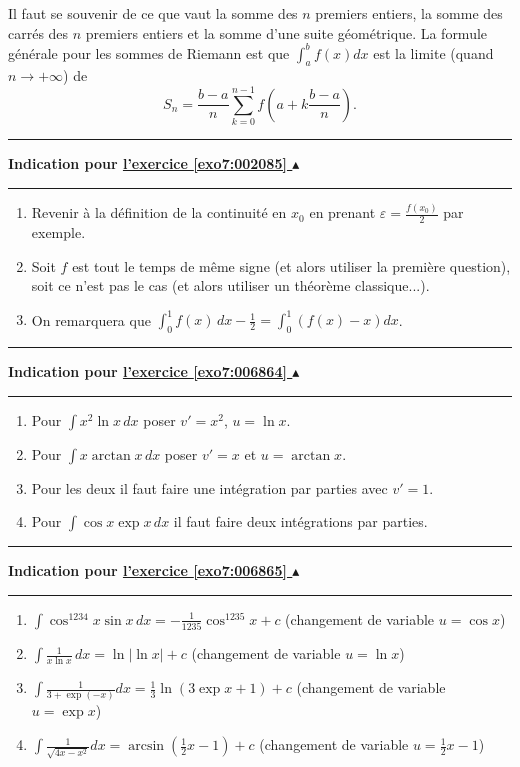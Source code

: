 \documentclass[11pt,a4paper]{article}
\renewcommand{\epsilon}{\varepsilon}
\newcommand{\noindication}{}
\newcounter{exo}
\newcommand{\indication}[1]{\hypertarget{ind7:#1}{}\label{ind7:#1}{\bf Indication pour \hyperlink{exo7:#1}{l'exercice \ref{exo7:#1} $\blacktriangle$}}\vspace{1mm}\hrule\vspace{1mm}}
\newcommand{\finindication}{\vspace{1mm}\hrule\vspace*{7mm}}
\begin{document}
Il faut se souvenir de ce que vaut la somme des $n$ premiers entiers, la somme des carrés des $n$ premiers entiers 
et la somme d'une suite géométrique.
La formule générale pour les sommes de Riemann est que $\int_a^bf(x)d x$
est la limite (quand $n \to +\infty$) de 
$$S_n = \frac {b-a}n \sum_{k=0}^{n-1} f\left(a+k\frac {b-a}n\right).$$
\finindication
\indication{002085}
  \begin{enumerate}
  \item Revenir à la définition de la continuité en $x_0$ en prenant $\epsilon = \frac {f(x_0)}{2}$ par exemple.
  \item Soit $f$ est tout le temps de même signe (et alors utiliser la première question), soit ce n'est pas le cas (et alors utiliser un théorème classique...).
  \item On remarquera que $\int_0^1 f(x) \, dx - \frac 12 = \int_0^1 (f(x) - x) dx$.
  \end{enumerate}
\finindication
\noindication
\indication{006864}
\begin{enumerate}
  \item Pour $\int x^2 \ln x \, dx$ poser $v'=x^2$, $u=\ln x$.

  \item Pour $\int x \arctan x \, dx$ poser $v'=x$ et $u= \arctan x$.

  \item Pour les deux il faut faire une intégration par parties avec $v'=1$.

  \item Pour $\int \cos x\exp x \,dx$ il faut faire deux intégrations par parties.
\end{enumerate}
\finindication
\indication{006865}
\begin{enumerate}
  \item $\int \cos^{1234} x   \sin x \, d x = -\frac 1{1235}\cos^{1235}x+c$ (changement de variable $u = \cos x$)

  \item $\int \frac 1{x\ln x} \, dx=\ln \left| \ln x\right| +c$  (changement de variable $u=\ln x$)

  \item $\int \frac 1{3+\exp \left( -x\right) }dx=\frac 13\ln \left( 3\exp
x+1\right) +c$ (changement de variable  $u=\exp x$)

  \item $\int \frac{1}{\sqrt{4x-x^2}}dx=\arcsin \left( \frac 12x-1\right) +c$  (changement de variable $u=\frac 12x-1$)
\end{enumerate}
\end{document}
